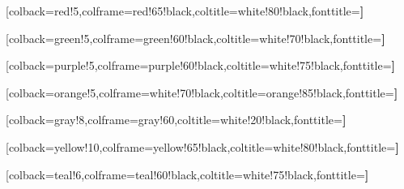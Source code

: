 [colback=red!5,colframe=red!65!black,coltitle=white!80!black,fonttitle=\bfseries]

[colback=green!5,colframe=green!60!black,coltitle=white!70!black,fonttitle=\bfseries]

[colback=purple!5,colframe=purple!60!black,coltitle=white!75!black,fonttitle=\bfseries]

[colback=orange!5,colframe=white!70!black,coltitle=orange!85!black,fonttitle=\bfseries]

[colback=gray!8,colframe=gray!60,coltitle=white!20!black,fonttitle=\bfseries]

[colback=yellow!10,colframe=yellow!65!black,coltitle=white!80!black,fonttitle=\bfseries]

[colback=teal!6,colframe=teal!60!black,coltitle=white!75!black,fonttitle=\bfseries]

\let\theorem     \cthteorema
\let\endtheorem  \endcthteorema
\let\definition  \cthdefinicion
\let\enddefinition\endcthdefinicion
\let\corollary   \cthcorolario
\let\endcorollary\endcthcorolario
\let\lemma       \cthlema
\let\endlemma    \endcthlema
\let\proposition \cthproposicion
\let\endproposition\endcthproposicion
\let\example     \cthejemplo
\let\endexample  \endcthejemplo
\let\remark      \cthnota
\let\endremark   \endcthnota